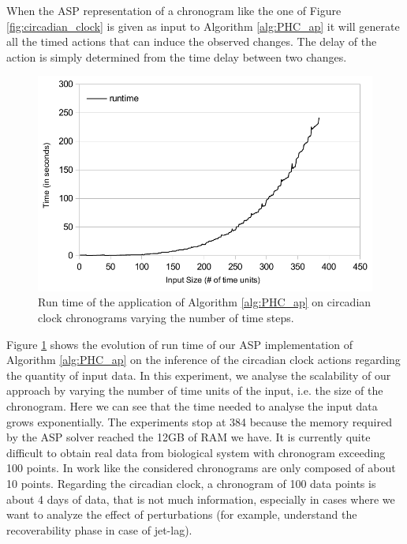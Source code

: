 When the ASP representation of a chronogram like the one of Figure \ref{fig:circadian_clock} is given as input to Algorithm \ref{alg:PHC_ap} it will generate all the timed actions that can induce the observed changes.
The delay of the action is simply determined from the time delay between two changes.

\begin{figure}[htb!]
\begin{center}
\includegraphics[width=0.5\linewidth]{images/circadian_run_time}
\end{center}
\caption{Run time of the application of Algorithm \ref{alg:PHC_ap} on circadian clock chronograms varying the number of time steps.}
\label{fig:run_time}
\end{figure}

Figure \ref{fig:run_time} shows the evolution of run time of our ASP implementation of Algorithm \ref{alg:PHC_ap} on the inference of the circadian clock actions regarding the quantity of input data.
In this experiment, we analyse the scalability of our approach by varying the number of time units of the input, i.e. the size of the chronogram.
Here we can see that the time needed to analyse the input data grows exponentially.
The experiments stop at 384 because the memory required by the ASP solver reached the 12GB of RAM we have.
It is currently quite difficult to obtain real data from biological system with chronogram exceeding 100 points.
In work like \cite{Fippo14} the considered chronograms are only composed of about 10 points.
Regarding the circadian clock, a chronogram of 100 data points is about 4 days of data, that is not much information, especially in cases where we want to analyze the effect of perturbations (for example, understand the recoverability phase in case of jet-lag). 

